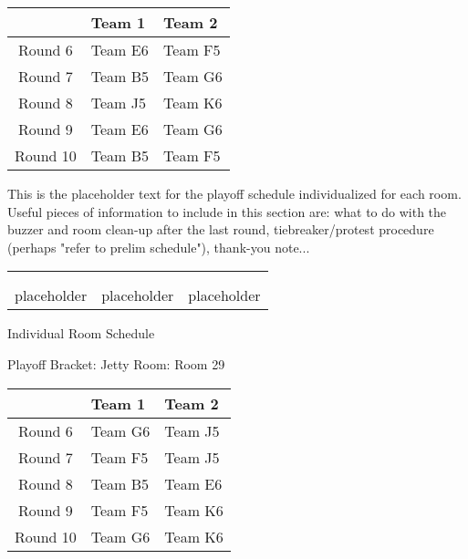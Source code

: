 \documentclass{article}%
\begin{document}
%
\begin{tabularx}{\textwidth}{|c|Y|Y|}%
\hline%
&Team 1&Team 2\\%
\hline%
Round 6&Team E6&Team F5\\%
Round 7&Team B5&Team G6\\%
Round 8&Team J5&Team K6\\%
Round 9&Team E6&Team G6\\%
Round 10&Team B5&Team F5\\%
\hline%
\end{tabularx}%
\vspace*{16pt}%
\linebreak%
This is the placeholder text for the playoff schedule individualized for each room. Useful pieces of information to include in this section are: what to do with the buzzer and room clean{-}up after the last round, tiebreaker/protest procedure (perhaps "refer to prelim schedule"), thank{-}you note...%
\vspace*{30pt}%
\newline%
%
\begin{tabularx}{\textwidth}{YYY}%
  &  &  \\%
\\%
placeholder&placeholder&placeholder\\%
\end{tabularx}%
\newpage%
\begin{center}%
\begin{Huge}%
Individual Room Schedule%
\end{Huge}%
\vspace*{16pt}%
\linebreak%
\begin{Large}%
Playoff Bracket: Jetty \hfill Room: Room 29%
\end{Large}%
\end{center}%
%
\begin{tabularx}{\textwidth}{|c|Y|Y|}%
\hline%
&Team 1&Team 2\\%
\hline%
Round 6&Team G6&Team J5\\%
Round 7&Team F5&Team J5\\%
Round 8&Team B5&Team E6\\%
Round 9&Team F5&Team K6\\%
Round 10&Team G6&Team K6\\%
\hline%
\end{tabularx}%
\end{document}
